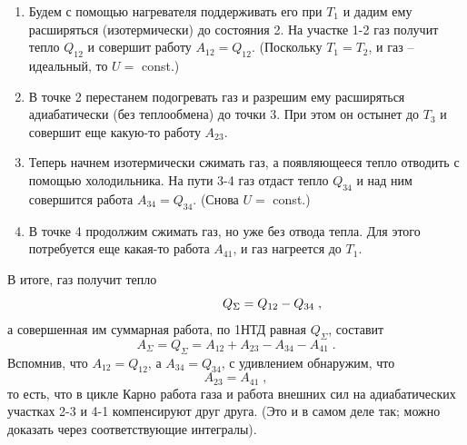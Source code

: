 \documentclass[12pt,epsfig,color,russian]{article}
\begin{document}
\begin{enumerate}
\item Будем с помощью нагревателя поддерживать его при $T_1$ и дадим ему расширяться (изотермически) до состояния 2. На участке 1-2 газ получит тепло $Q_{12}$ и совершит работу $A_{12}=Q_{12}$. (Поскольку $T_1=T_2$, и газ -- идеальный, то $U=$ const.)
\item В точке 2 перестанем подогревать газ и разрешим ему расширяться адиабатически (без теплообмена) до точки 3. При этом он остынет до $T_3$ и совершит еще какую-то работу $A_{23}$.
\item Теперь начнем изотермически сжимать газ, а появляющееся тепло отводить с помощью холодильника. На пути 3-4 газ отдаст тепло $Q_{34}$ и над ним совершится работа $A_{34}=Q_{34}$. (Снова $U=$ const.)
\item В точке 4 продолжим сжимать газ, но уже без отвода тепла. Для этого потребуется еще какая-то работа $A_{41}$, и газ нагреется до $T_1$.
\end{enumerate}
В итоге, газ получит тепло\vspace{-12mm}
\begin{displaymath}
\hspace{20mm}Q_\Sigma=Q_{12}-Q_{34}\;,
\end{displaymath}
а совершенная им суммарная работа, по 1НТД равная $Q_\Sigma$,  составит
\begin{displaymath}
A_\Sigma=Q_\Sigma=A_{12}+A_{23}-A_{34}-A_{41}\;.
\end{displaymath}
Вспомнив, что  $A_{12}=Q_{12}$, а $A_{34}=Q_{34}$, с удивлением обнаружим, что
\begin{displaymath}
A_{23}=A_{41}\;,
\end{displaymath}
то есть, что в цикле Карно работа газа и работа внешних сил на адиа\-ба\-ти\-чес\-ких участках 2-3 и 4-1 компенсируют друг друга. (Это и в самом деле так; можно доказать через соответствующие интегралы).
\end{document}
